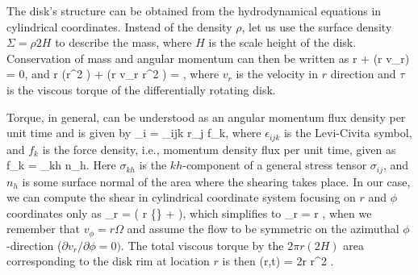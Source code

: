 The disk's structure can be obtained from the hydrodynamical equations in cylindrical coordinates.
Instead of the density $\rho$, let us use the surface density $\Sigma = \rho 2 H$ to describe the mass, where $H$ is the scale height of the disk.
Conservation of mass and angular momentum can then be written as\cite[see e.g.,][]{Cho98, FKR02}
\be\label{eq:disk_1}
r  + (r \Sigma v_r) = 0,
\ee
and
\be\label{eq:disk_2}
r (\Sigma r^2 \Omega) +  (r \Sigma v_r r^2 \Omega) =  ,
\ee
where $v_r$ is the velocity in $r$ direction and $\tau$ is the viscous torque of the differentially rotating disk.

Torque, in general, can be understood as an angular momentum flux density per unit time and is given by
\be
\tau_i = \epsilon_{ijk} r_j f_k,
\ee
where $\epsilon_{ijk}$ is the Levi-Civita symbol, and $f_k$ is the force density, i.e., momentum density flux per unit time, given as
\be
f_k = \sigma_{kh} n_h.
\ee
Here $\sigma_{kh}$ is the $kh$-component of a general stress tensor $\sigma_{ij}$, and $n_h$ is some surface normal of the area where the shearing takes place.
In our case, we can compute the shear in cylindrical coordinate system focusing on $r$ and $\phi$ coordinates only as\cite[see e.g.,][]{Cho98}
\be
\sigma_{r\phi} = \rho \nu \left( r  \left\{\right\} +   \right),
\ee
which simplifies to 
\be
\sigma_{r\phi} = \rho \nu r ,
\ee
when we remember that $v_{\phi} = r \Omega$ and assume the flow to be symmetric on the azimuthal $\phi$-direction ($\partial v_r/\partial \phi = 0)$.
The total viscous torque   by the $2\pi r (2 H)$ area corresponding to the disk rim at location $r$ is then
\be
\tau(r,t) = 2\pi r \nu \Sigma r^2 .
\ee

